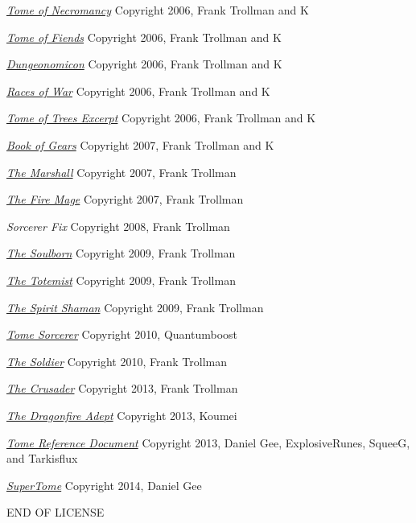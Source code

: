 \begin{small}
\begin{enumerate}
\href{http://www.tgdmb.com/viewtopic.php?t=34248}{\textit{Tome of Necromancy}} Copyright 2006, Frank Trollman and K

\href{http://www.tgdmb.com/viewtopic.php?t=28828}{\textit{Tome of Fiends}} Copyright 2006, Frank Trollman and K

\href{http://www.tgdmb.com/viewtopic.php?t=28547}{\textit{Dungeonomicon}} Copyright 2006, Frank Trollman and K

\href{http://www.tgdmb.com/viewtopic.php?t=33294}{\textit{Races of War}} Copyright 2006, Frank Trollman and K

\href{http://www.tgdmb.com/viewtopic.php?t=33294}{\textit{Tome of Trees Excerpt}} Copyright 2006, Frank Trollman and K

\href{http://www.tgdmb.com/viewtopic.php?t=35813}{\textit{Book of Gears}} Copyright 2007, Frank Trollman and K

\href{http://www.tgdmb.com/viewtopic.php?p=24348#24348}{\textit{The Marshall}} Copyright 2007, Frank Trollman

\href{http://www.tgdmb.com/viewtopic.php?p=40226#40226}{\textit{The Fire Mage}} Copyright 2007, Frank Trollman

\textit{Sorcerer Fix} Copyright 2008, Frank Trollman

\href{http://www.tgdmb.com/viewtopic.php?t=50472}{\textit{The Soulborn}} Copyright 2009, Frank Trollman

\href{http://www.tgdmb.com/viewtopic.php?t=50483}{\textit{The Totemist}} Copyright 2009, Frank Trollman

\href{http://www.tgdmb.com/viewtopic.php?p=105974#105974}{\textit{The Spirit Shaman}} Copyright 2009, Frank Trollman

\href{http://dndwiki.com/wiki/Sorcerer,_Tome_(3.5e_Class)}{\textit{Tome Sorcerer}} Copyright 2010,  Quantumboost

\href{http://tgdmb.com/viewtopic.php?t=50949}{\textit{The Soldier}} Copyright 2010, Frank Trollman

\href{http://www.tgdmb.com/viewtopic.php?t=54090}{\textit{The Crusader}} Copyright 2013, Frank Trollman

\href{http://www.tgdmb.com/viewtopic.php?p=318737}{\textit{The Dragonfire Adept}} Copyright 2013, Koumei

\href{https://github.com/SqueeG/awesomeTome}{\textit{Tome Reference Document}} Copyright 2013, Daniel Gee, ExplosiveRunes, SqueeG, and Tarkisflux

\href{https://github.com/Lokathor/SuperTome}{\textit{SuperTome}} Copyright 2014, Daniel Gee
\end{enumerate}

END OF LICENSE

\end{small}